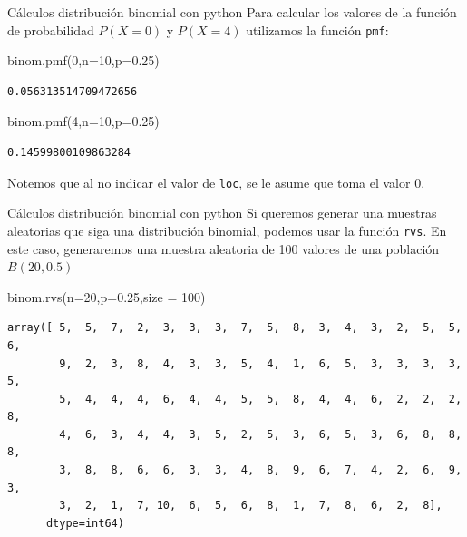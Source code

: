 \documentclass[
  ignorenonframetext,
  aspectratio=169]{beamer}
\newenvironment{Shaded}{\begin{snugshade}}{\end{snugshade}}
\newcommand{\DecValTok}[1]{\textcolor[rgb]{0.68,0.00,0.00}{#1}}
\newcommand{\FloatTok}[1]{\textcolor[rgb]{0.68,0.00,0.00}{#1}}
\newcommand{\NormalTok}[1]{\textcolor[rgb]{0.00,0.23,0.31}{#1}}
\newcommand{\OperatorTok}[1]{\textcolor[rgb]{0.37,0.37,0.37}{#1}}
\begin{document}
\begin{frame}[fragile]{Cálculos distribución binomial con python}
\protect\hypertarget{cuxe1lculos-distribuciuxf3n-binomial-con-python-2}{}
Para calcular los valores de la función de probabilidad \(P(X=0)\) y
\(P(X=4)\) utilizamos la función \texttt{pmf}:

\begin{Shaded}
\begin{Highlighting}[]
\NormalTok{binom.pmf(}\DecValTok{0}\NormalTok{,n}\OperatorTok{=}\DecValTok{10}\NormalTok{,p}\OperatorTok{=}\FloatTok{0.25}\NormalTok{)}
\end{Highlighting}
\end{Shaded}

\begin{verbatim}
0.056313514709472656
\end{verbatim}

\begin{Shaded}
\begin{Highlighting}[]
\NormalTok{binom.pmf(}\DecValTok{4}\NormalTok{,n}\OperatorTok{=}\DecValTok{10}\NormalTok{,p}\OperatorTok{=}\FloatTok{0.25}\NormalTok{)}
\end{Highlighting}
\end{Shaded}

\begin{verbatim}
0.14599800109863284
\end{verbatim}

Notemos que al no indicar el valor de \texttt{loc}, se le asume que toma
el valor 0.
\end{frame}

\begin{frame}[fragile]{Cálculos distribución binomial con python}
\protect\hypertarget{cuxe1lculos-distribuciuxf3n-binomial-con-python-3}{}
Si queremos generar una muestras aleatorias que siga una distribución
binomial, podemos usar la función \texttt{rvs}. En este caso,
generaremos una muestra aleatoria de 100 valores de una población
\(B(20,0.5)\)

\begin{Shaded}
\begin{Highlighting}[]
\NormalTok{binom.rvs(n}\OperatorTok{=}\DecValTok{20}\NormalTok{,p}\OperatorTok{=}\FloatTok{0.25}\NormalTok{,size }\OperatorTok{=} \DecValTok{100}\NormalTok{)}
\end{Highlighting}
\end{Shaded}

\begin{verbatim}
array([ 5,  5,  7,  2,  3,  3,  3,  7,  5,  8,  3,  4,  3,  2,  5,  5,  6,
        9,  2,  3,  8,  4,  3,  3,  5,  4,  1,  6,  5,  3,  3,  3,  3,  5,
        5,  4,  4,  4,  6,  4,  4,  5,  5,  8,  4,  4,  6,  2,  2,  2,  8,
        4,  6,  3,  4,  4,  3,  5,  2,  5,  3,  6,  5,  3,  6,  8,  8,  8,
        3,  8,  8,  6,  6,  3,  3,  4,  8,  9,  6,  7,  4,  2,  6,  9,  3,
        3,  2,  1,  7, 10,  6,  5,  6,  8,  1,  7,  8,  6,  2,  8],
      dtype=int64)
\end{verbatim}
\end{frame}
\end{document}
